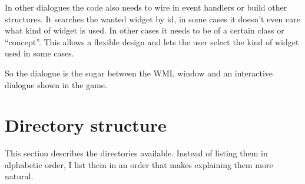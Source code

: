 In other dialogues the code also needs to wire in event handlers or build other
structures. It searches the wanted widget by id, in some cases it doesn't even
care what kind of widget is used. In other cases it needs to be of a certain
class or ``concept''. This allows a flexible design and lets the user select the
kind of widget used in some cases.

So the dialogue is the sugar between the WML window and an interactive dialogue
shown in the game.

\section{Directory structure}

This section describes the directories available. Instead of listing them in
alphabetic order, I list them in an order that makes explaining them more natural.

